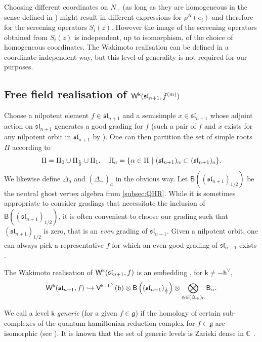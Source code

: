 \documentclass[10pt,a4paper]{amsart}
\numberwithin{equation}{section}
\newcommand{\kk}{\mathsf{k}}   %
\DeclarePairedDelimiter{\brac}{\lparen}{\rparen}   %
\DeclarePairedDelimiter{\set}{\lbrace}{\rbrace}
\newcommand{\fld}[1]{\mathbb{#1}}    %
\newcommand{\alg}[1]{\mathfrak{#1}}  %
\newcommand{\VOA}[1]{\mathsf{#1}}    %
\newcommand{\CC}{\fld{C}}
\newcommand{\SLA}[2]{\alg{#1}_{#2}}                      %
\newcommand{\slnpone}{\SLA{sl}{n+1}}
\newcommand{\cartan}{\mathfrak{h}}
\newcommand{\cox}{\mathsf{h}}                                        %
\newcommand{\dcox}{\coroot{\cox}}                                    %
\newcommand{\roots}{\Delta}                                          %
\newcommand{\proots}{\Delta_+}                                       %
\newcommand{\sroots}{\Pi}                                            %
\newcommand{\prvec}[1]{e_{#1}}                                        %
\newcommand{\coroot}[1]{#1^{\vee}}                                   %
\newcommand{\fhook}[1]{f^{(#1)}}                                  %
\newcommand{\Wsymb}{\VOA{W}}
\newcommand{\uaffvoa}[2]{\VOA{V}^{#1}\brac{#2}}                   %
\newcommand{\bgvoa}{\VOA{B}}                                      %
\newcommand{\uQHR}[3]{\Wsymb^{#1}\brac{#2,#3}}                    %
\theoremstyle{plain}
\begin{document}
Choosing different coordinates on $N_+$ (as long as they are homogeneous in the sense defined in \cite{Fre05Opers}) might result in different expressions for $ \rho^R(\prvec{i})$ and therefore for the screening operators $S_i(z)$. However the image of the screening operators obtained from $S_i(z)$ is independent, up to isomorphism, of the choice of homogeneous coordinates. The Wakimoto realisation can be defined in a coordinate-independent way, but this level of generality is not required for our purposes.


\subsection{Free field realisation of \texorpdfstring{$\uQHR{\kk}{\slnpone}{\fhook{m}}$}{Wk(sln+1,fm)}} \label{subsec:WakWalg}

Choose a nilpotent element $f \in \slnpone$ and a semisimple $x \in \slnpone$ whose adjoint action on $\slnpone$ generates a good grading for $f$ (such a pair of $f$ and $x$ exists for any nilpotent orbit in $\slnpone$ by \cite[Thm.~4.1]{ElasClass05}). One can then partition the set of simple roots $\sroots$ according to
%
\begin{equation}
    \sroots = \sroots_0 \cup \sroots_{\frac{1}{2}} \cup \sroots_{1}, \quad \sroots_a = \set{\alpha \in \sroots \ \vert \ (\slnpone)_\alpha \subset (\slnpone)_{a}}.
\end{equation}
%
We likewise define $\roots_a$ and $(\proots)_a$ in the obvious way. Let $\bgvoa\left((\slnpone)_{1/2}\right)$ be the neutral ghost vertex algebra from \cref{subsec:QHR}. While it is sometimes appropriate to consider gradings that necessitate the inclusion of $\bgvoa\left((\slnpone)_{1/2}\right)$, it is often convenient to choose our grading such that $(\slnpone)_{1/2}$ is zero, that is an \emph{even} grading of $\slnpone$. Given a nilpotent orbit, one can always pick a representative $f$ for which an even good grading of $\slnpone$ exists \cite[Prop.~4.2]{ElasClass05}.

The Wakimoto realisation of $\uQHR{\kk}{\slnpone}{f}$ is an embedding  \cite{GenScreen20}, for $\kk \neq -\dcox$,
%
\begin{equation}
    \uQHR{\kk}{\slnpone}{f} \hookrightarrow \uaffvoa{\kk+\dcox}{\cartan}\otimes \bgvoa\left((\slnpone)_{\frac{1}{2}}\right) \otimes \bigotimes_{\alpha \in (\proots)_0} \bgvoa_\alpha.
\end{equation}

We call a level $\kk$ \emph{generic} (for a given $f \in \mathfrak{g}$) if the homology of certain sub-complexes of the quantum hamiltonian reduction complex for $f \in \mathfrak{g}$ are isomorphic (see \cite[Def.~4.5]{Gen17}). It is known that the set of generic levels is Zariski dense in $\CC$ \cite[Lem.~4.4]{Gen17}.
\end{document}

